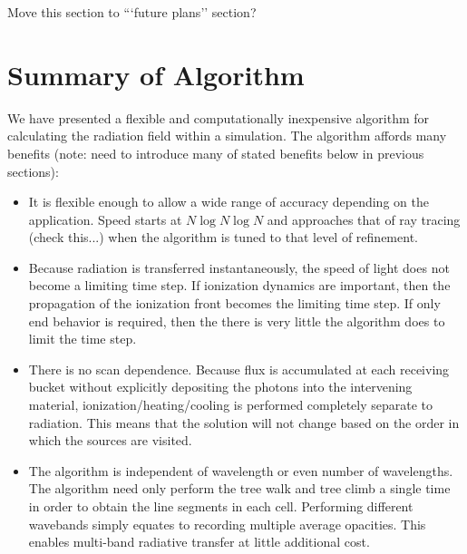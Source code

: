Move this section to ```future plans'' section?

\section{Summary of Algorithm}
\label{sec:algorithmsummary}

We have presented a flexible and computationally inexpensive algorithm for calculating the radiation field within a simulation. The algorithm affords many benefits (note: need to introduce many of stated benefits below in previous sections):

\begin{itemize}
\item It is flexible enough to allow a wide range of accuracy depending on the application. Speed starts at  $N\log{N}\log{N}$ and approaches that of ray tracing (check this...) when the algorithm is tuned to that level of refinement.
\item Because radiation is transferred instantaneously, the speed of light does not become a limiting time step. If ionization dynamics are important, then the propagation of the ionization front becomes the limiting time step. If only end behavior is required, then the there is very little the algorithm does to limit the time step.
\item There is no scan dependence. Because flux is accumulated at each receiving bucket without explicitly depositing the photons into the intervening material, ionization/heating/cooling is performed completely separate to radiation. This means that the solution will not change based on the order in which the sources are visited.
\item The algorithm is independent of wavelength or even number of wavelengths. The algorithm need only perform the tree walk and tree climb a single time in order to obtain the line segments in each cell. Performing different wavebands simply equates to recording multiple average opacities. This enables multi-band radiative transfer at little additional cost.
\end{itemize}

